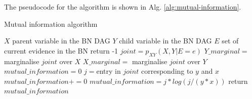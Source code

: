 The pseudocode for the algorithm is shown in Alg. \ref{alg:mutual-information}.

\begin{algorithm}[htp!]
	\caption{Mutual information algorithm}
	\label{alg:mutual-information}
	\begin{algorithmic}[1]
		\State $X$ parent variable in the BN DAG
		\State $Y$ child variable in the BN DAG
		\State $E$ set of current evidence in the BN
			\State return -1
		\EndIf
		\State $joint=p_{XY}(X, Y|E=e)$
		\State $Y\_marginal=$ marginalise $joint$ over $X$
		\State $X\_marginal=$ marginalise $joint$ over $Y$
		\State $mutual\_information = 0$
				\State $j=$entry in $joint$ corresponding to $y$ and $x$
					\State $mutual\_information += 0$
				\Else
					\State $mutual\_information = j * log( j / ( y * x ) )$
				\EndIf
			\EndFor
		\EndFor
		\State return $mutual\_information$
	\end{algorithmic}
\end{algorithm}
